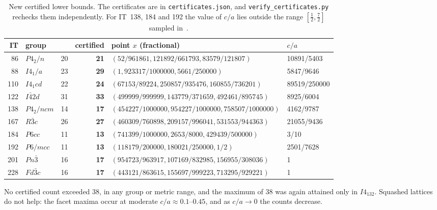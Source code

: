 \documentclass[11pt]{amsart}
\theoremstyle{definition}
\begin{document}
\begin{table}[ht]
\centering\small
\begin{tabular}{@{}rlrrll@{}}
\toprule
IT & group & \cite{Sch16} & certified & point $x$ (fractional) & $c/a$ \\
\midrule
86 & $P4_2/n$ & 20 & \textbf{21} & \scriptsize $(52/961861, 121892/661793, 83579/121807)$ & \scriptsize 10891/5403 \\
88 & $I4_1/a$ & 23 & \textbf{29} & \scriptsize $(1, 923317/1000000, 5661/250000)$ & \scriptsize 5847/9646 \\
110 & $I4_1cd$ & 22 & \textbf{24} & \scriptsize $(67153/89224, 250857/935476, 160855/736201)$ & \scriptsize 89519/250000 \\
122 & $I\bar42d$ & 31 & \textbf{33} & \scriptsize $(499999/999999, 143779/371659, 492461/895745)$ & \scriptsize 8925/6004 \\
138 & $P4_2/ncm$ & 14 & \textbf{17} & \scriptsize $(454227/1000000, 954227/1000000, 758507/1000000)$ & \scriptsize 4162/9787 \\
167 & $R\bar3c$ & 26 & \textbf{27} & \scriptsize $(460309/760898, 209157/996041, 531553/944363)$ & \scriptsize 21055/9436 \\
184 & $P6cc$ & 11 & \textbf{13} & \scriptsize $(741399/1000000, 2653/8000, 429439/500000)$ & \scriptsize 3/10 \\
192 & $P6/mcc$ & 11 & \textbf{13} & \scriptsize $(118179/200000, 180021/250000, 1/2)$ & \scriptsize 2501/7628 \\
201 & $Pn\bar3$ & 16 & \textbf{17} & \scriptsize $(954723/963917, 107169/832985, 156955/308036)$ & \scriptsize 1 \\
228 & $Fd\bar3c$ & 16 & \textbf{17} & \scriptsize $(443121/863615, 155697/999223, 713295/929221)$ & \scriptsize 1 \\
\bottomrule
\end{tabular}
\medskip
\caption{New certified lower bounds. The certificates are in \texttt{certificates.json}, and
\texttt{verify\_certificates.py} rechecks them independently. For IT~138, 184 and 192 the value of $c/a$ lies outside the
range $[\tfrac12,\tfrac72]$ sampled in~\cite{Sch16}.}\label{tab:cert}
\end{table}

No certified count exceeded $38$, in any group or metric range, and the maximum of $38$ was again attained only in
$I4_132$. Squashed lattices do not help: the facet maxima occur at moderate $c/a\approx0.1$--$0.45$, and as $c/a\to0$
the counts decrease.
\end{document}
